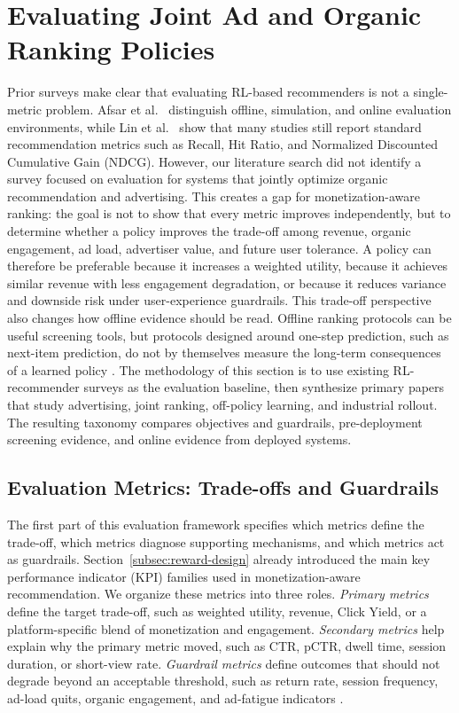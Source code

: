 \documentclass[manuscript,review,screen]{acmart}
\begin{document}
\section{Evaluating Joint Ad and Organic Ranking Policies}
\label{sec:evaluation}

Prior surveys make clear that evaluating RL-based recommenders is not a single-metric problem. Afsar et al.\ \cite{afsar2022reinforcement} distinguish offline, simulation, and online evaluation environments, while Lin et al.\ \cite{lin2023survey} show that many studies still report standard recommendation metrics such as Recall, Hit Ratio, and Normalized Discounted Cumulative Gain (NDCG). However, our literature search did not identify a survey focused on evaluation for systems that jointly optimize organic recommendation and advertising. This creates a gap for monetization-aware ranking: the goal is not to show that every metric improves independently, but to determine whether a policy improves the trade-off among revenue, organic engagement, ad load, advertiser value, and future user tolerance. A policy can therefore be preferable because it increases a weighted utility, because it achieves similar revenue with less engagement degradation, or because it reduces variance and downside risk under user-experience guardrails. This trade-off perspective also changes how offline evidence should be read. Offline ranking protocols can be useful screening tools, but protocols designed around one-step prediction, such as next-item prediction, do not by themselves measure the long-term consequences of a learned policy \cite{deffayet2022offline}. The methodology of this section is to use existing RL-recommender surveys as the evaluation baseline, then synthesize primary papers that study advertising, joint ranking, off-policy learning, and industrial rollout. The resulting taxonomy compares objectives and guardrails, pre-deployment screening evidence, and online evidence from deployed systems.

\subsection{Evaluation Metrics: Trade-offs and Guardrails}
\label{subsec:evaluation-metrics}

The first part of this evaluation framework specifies which metrics define the trade-off, which metrics diagnose supporting mechanisms, and which metrics act as guardrails. Section~\ref{subsec:reward-design} already introduced the main key performance indicator (KPI) families used in monetization-aware recommendation. We organize these metrics into three roles. \emph{Primary metrics} define the target trade-off, such as weighted utility, revenue, Click Yield, or a platform-specific blend of monetization and engagement. \emph{Secondary metrics} help explain why the primary metric moved, such as CTR, pCTR, dwell time, session duration, or short-view rate. \emph{Guardrail metrics} define outcomes that should not degrade beyond an acceptable threshold, such as return rate, session frequency, ad-load quits, organic engagement, and ad-fatigue indicators \cite{zhang2018whole, yan2020ads, sagtani2023quantifying}.
\end{document}
